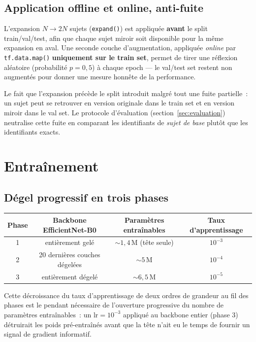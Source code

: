 \documentclass[12pt, a4paper]{article}
\begin{document}
\subsection{Application offline et online, anti-fuite}

L'expansion $N \to 2N$ sujets (\texttt{expand()}) est appliquée
\textbf{avant} le split train/val/test, afin que chaque sujet miroir soit
disponible pour la même expansion en aval. Une seconde couche
d'augmentation, appliquée \textit{online} par \texttt{tf.data.map()}
\textbf{uniquement sur le train set}, permet de tirer une réflexion
aléatoire (probabilité $p=0{,}5$) à chaque epoch — le val/test set restent
non augmentés pour donner une mesure honnête de la performance.

Le fait que l'expansion précède le split introduit malgré tout une fuite
partielle~: un sujet peut se retrouver en version originale dans le train
set et en version miroir dans le val set. Le protocole d'évaluation
(section~\ref{sec:evaluation}) neutralise cette fuite en comparant les
identifiants de \emph{sujet de base} plutôt que les identifiants exacts.

\section{Entraînement}
\label{sec:training}

\subsection{Dégel progressif en trois phases}

\begin{center}
\begin{tabular}{cccc}
\toprule
Phase & Backbone EfficientNet-B0 & Paramètres entraînables & Taux d'apprentissage \\
\midrule
1 & entièrement gelé & $\sim 1{,}4$\,M (tête seule) & $10^{-3}$ \\
2 & 20 dernières couches dégelées & $\sim 5$\,M & $10^{-4}$ \\
3 & entièrement dégelé & $\sim 6{,}5$\,M & $10^{-5}$ \\
\bottomrule
\end{tabular}
\end{center}

Cette décroissance du taux d'apprentissage de deux ordres de grandeur au
fil des phases est le pendant nécessaire de l'ouverture progressive du
nombre de paramètres entraînables~: un $\mathrm{lr}=10^{-3}$ appliqué au
backbone entier (phase 3) détruirait les poids pré-entraînés avant que la
tête n'ait eu le temps de fournir un signal de gradient informatif.
\end{document}
